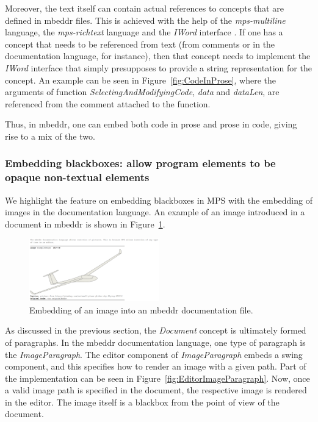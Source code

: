 \documentclass[preprint,numbers,10pt]{sigplanconf}
\begin{document}
Moreover, the text itself can contain actual references to concepts that are defined in mbeddr files.
This is achieved with the help of the \emph{mps-multiline} language, the \emph{mps-richtext} language
and the \emph{IWord} interface \cite{voelter2013integrating}.
If one has a concept that needs to be referenced from text (from comments or in the documentation language, for instance), then
that concept needs to implement the \emph{IWord} interface that simply presupposes to provide a string representation
for the concept. An example can be seen in Figure~\ref{fig:CodeInProse}, where the arguments of function
\emph{SelectingAndModifyingCode}, \emph{data} and \emph{dataLen}, are referenced from the comment attached
to the function.

Thus, in mbeddr, one can embed both code in prose and prose in code, giving rise to a mix of the two.
\subsubsection{Embedding blackboxes: allow program elements to be opaque non-textual elements}
We highlight the feature on embedding blackboxes in MPS with the embedding of images
in the documentation language. An example of an image introduced in a document in mbeddr is shown in Figure~\ref{fig:ImageInDoc}.

\begin{figure}[H]
	\centering
	\includegraphics[width=0.50\textwidth]{screens/PlaneGlider.png}
	\caption{Embedding of an image into an mbeddr documentation file.}
	\label{fig:ImageInDoc}
\end{figure}

As discussed in the previous section, the \emph{Document} concept is ultimately formed of paragraphs.
In the mbeddr documentation language, one type of paragraph is the \emph{ImageParagraph}. The editor
component of \emph{ImageParagraph} embeds a swing component, and this specifies how to render an image
with a given path. Part of the implementation can be seen in Figure~\ref{fig:EditorImageParagraph}.
Now, once a valid image path is specified in the document, the respective image
is rendered in the editor. The image itself is a blackbox from the point of view of the document.
\end{document}
